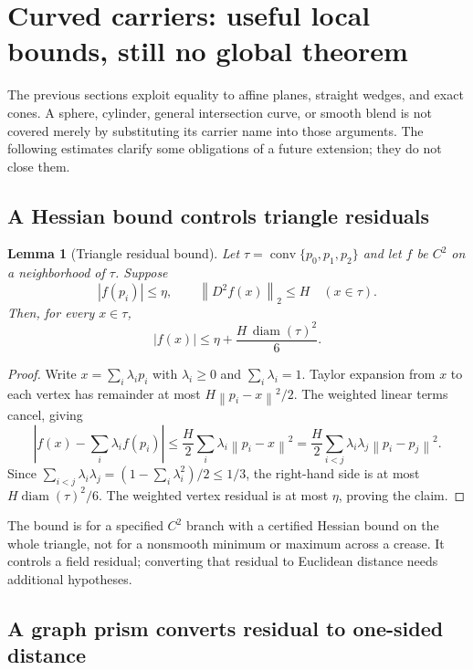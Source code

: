 \documentclass[11pt]{article}
\newtheorem{lemma}[theorem]{Lemma}
\theoremstyle{definition}
\theoremstyle{remark}
\newcommand{\diam}{\operatorname{diam}}
\newcommand{\conv}{\operatorname{conv}}
\newcommand{\norm}[1]{\left\lVert #1\right\rVert}
\begin{document}
\section{Curved carriers: useful local bounds, still no global theorem}
\label{sec:curved}

The previous sections exploit equality to affine planes, straight
wedges, and exact cones. A sphere, cylinder, general intersection
curve, or smooth blend is not covered merely by substituting its
carrier name into those arguments. The following estimates clarify
some obligations of a future extension; they do not close them.

\subsection{A Hessian bound controls triangle residuals}

\begin{lemma}[Triangle residual bound]
\label{lem:triangle-residual}
Let $\tau=\conv\{p_0,p_1,p_2\}$ and let $f$ be $C^2$ on a
neighborhood of $\tau$. Suppose
\[
  |f(p_i)|\le\eta,\qquad
  \norm{D^2 f(x)}_2\le H\quad(x\in\tau).
\]
Then, for every $x\in\tau$,
\[
  |f(x)|\le \eta+\frac{H\,\diam(\tau)^2}{6}.
  \tag{11}\label{eq:triangle-residual}
\]
\end{lemma}

\begin{proof}
Write $x=\sum_i\lambda_i p_i$ with $\lambda_i\ge0$ and
$\sum_i\lambda_i=1$. Taylor expansion from $x$ to each vertex has
remainder at most $H\norm{p_i-x}^2/2$. The weighted linear terms
cancel, giving
\[
  \left|f(x)-\sum_i\lambda_i f(p_i)\right|
  \le\frac H2\sum_i\lambda_i\norm{p_i-x}^2
  =\frac H2\sum_{i<j}\lambda_i\lambda_j\norm{p_i-p_j}^2.
\]
Since $\sum_{i<j}\lambda_i\lambda_j
=(1-\sum_i\lambda_i^2)/2\le1/3$, the right-hand side is at
most $H\diam(\tau)^2/6$. The weighted vertex residual is at most
$\eta$, proving the claim.
\end{proof}

The bound is for a specified $C^2$ branch with a certified Hessian
bound on the whole triangle, not for a nonsmooth minimum or maximum
across a crease. It controls a field residual; converting that residual
to Euclidean distance needs additional hypotheses.

\subsection{A graph prism converts residual to one-sided distance}
\end{document}
